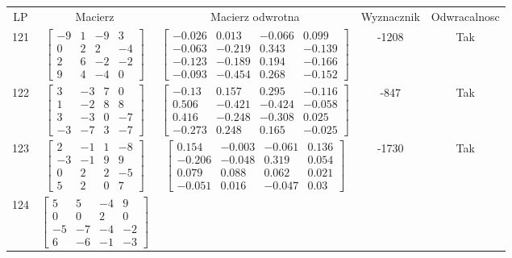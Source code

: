 \documentclass[a4paper,12pt]{article}
\begin{document}
\bgroup {} \vspace{0.2in} \begin{tabular}{c c c c c}
LP & Macierz & Macierz odwrotna & Wyznacznik & Odwracalnosc\\
121
&
$\begin{bmatrix} -9 & 1 & -9 & 3 \\ 0 & 2 & 2 & -4 \\ 2 & 6 & -2 & -2 \\ 9 & 4 & -4 & 0 \end{bmatrix}$
&
$\begin{bmatrix} -0.026 & 0.013 & -0.066 & 0.099 \\ -0.063 & -0.219 & 0.343 & -0.139 \\ -0.123 & -0.189 & 0.194 & -0.166 \\ -0.093 & -0.454 & 0.268 & -0.152 \end{bmatrix}$
&
-1208
&
Tak
\\
122
&
$\begin{bmatrix} 3 & -3 & 7 & 0 \\ 1 & -2 & 8 & 8 \\ 3 & -3 & 0 & -7 \\ -3 & -7 & 3 & -7 \end{bmatrix}$
&
$\begin{bmatrix} -0.13 & 0.157 & 0.295 & -0.116 \\ 0.506 & -0.421 & -0.424 & -0.058 \\ 0.416 & -0.248 & -0.308 & 0.025 \\ -0.273 & 0.248 & 0.165 & -0.025 \end{bmatrix}$
&
-847
&
Tak
\\
123
&
$\begin{bmatrix} 2 & -1 & 1 & -8 \\ -3 & -1 & 9 & 9 \\ 0 & 2 & 2 & -5 \\ 5 & 2 & 0 & 7 \end{bmatrix}$
&
$\begin{bmatrix} 0.154 & -0.003 & -0.061 & 0.136 \\ -0.206 & -0.048 & 0.319 & 0.054 \\ 0.079 & 0.088 & 0.062 & 0.021 \\ -0.051 & 0.016 & -0.047 & 0.03 \end{bmatrix}$
&
-1730
&
Tak
\\
124
&
$\begin{bmatrix} 5 & 5 & -4 & 9 \\ 0 & 0 & 2 & 0 \\ -5 & -7 & -4 & -2 \\ 6 & -6 & -1 & -3 \end{bmatrix}$

\end{tabular}
\end{document}
